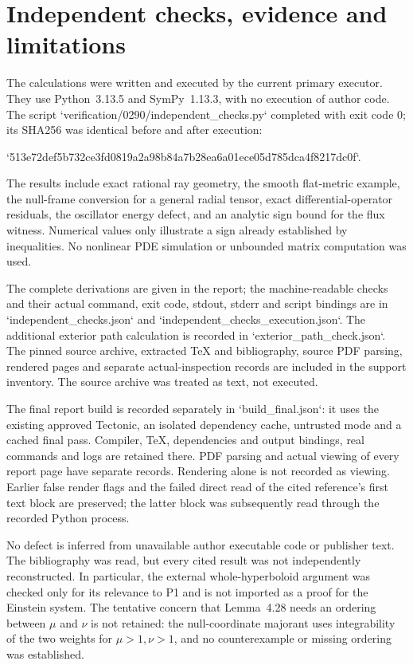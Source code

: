\documentclass[10pt]{article}
\begin{document}
\section*{Independent checks, evidence and limitations}
The calculations were written and executed by the current primary executor. They use Python 3.13.5 and SymPy 1.13.3, with no execution of author code. The script `verification/0290/independent\_checks.py` completed with exit code \(0\); its SHA256 was identical before and after execution:\par
`513e72def5b732ce3fd0819a2a98b84a7b28ea6a01ece05d785dca4f8217dc0f`.\par
The results include exact rational ray geometry, the smooth flat-metric example, the null-frame conversion for a general radial tensor, exact differential-operator residuals, the oscillator energy defect, and an analytic sign bound for the flux witness. Numerical values only illustrate a sign already established by inequalities. No nonlinear PDE simulation or unbounded matrix computation was used.\par
The complete derivations are given in the report; the machine-readable checks and their actual command, exit code, stdout, stderr and script bindings are in `independent\_checks.json` and `independent\_checks\_execution.json`. The additional exterior path calculation is recorded in `exterior\_path\_check.json`. The pinned source archive, extracted TeX and bibliography, source PDF parsing, rendered pages and separate actual-inspection records are included in the support inventory. The source archive was treated as text, not executed.\par
The final report build is recorded separately in `build\_final.json`: it uses the existing approved Tectonic, an isolated dependency cache, untrusted mode and a cached final pass. Compiler, TeX, dependencies and output bindings, real commands and logs are retained there. PDF parsing and actual viewing of every report page have separate records. Rendering alone is not recorded as viewing. Earlier false render flags and the failed direct read of the cited reference’s first text block are preserved; the latter block was subsequently read through the recorded Python process.\par
No defect is inferred from unavailable author executable code or publisher text. The bibliography was read, but every cited result was not independently reconstructed. In particular, the external whole-hyperboloid argument was checked only for its relevance to P1 and is not imported as a proof for the Einstein system. The tentative concern that Lemma 4.28 needs an ordering between \(\mu\) and \(\nu\) is not retained: the null-coordinate majorant uses integrability of the two weights for \(\mu>1,\nu>1\), and no counterexample or missing ordering was established.\par
\end{document}
